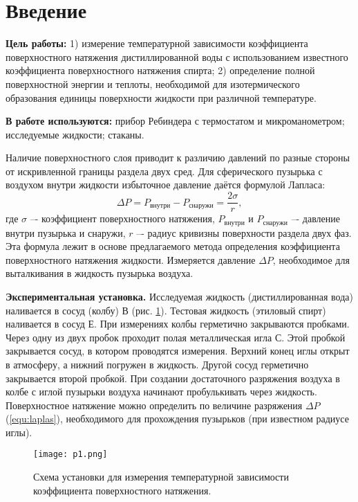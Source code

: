 \section{Введение}

\textbf{Цель работы:}
1) измерение температурной зависимости  коэффициента поверхностного натяжения дистиллированной воды с использованием известного коэффициента поверхностного натяжения спирта;  2) определение полной поверхностной энергии  и теплоты, необходимой для изотермического образования единицы  поверхности жидкости  при различной температуре.

\textbf{В работе используются:}
прибор  Ребиндера  с термостатом и микроманометром; исследуемые жидкости; стаканы.

Наличие поверхностного слоя приводит к различию давлений по разные стороны от искривленной границы раздела двух сред.  Для сферического пузырька с воздухом  внутри жидкости избыточное давление даётся формулой Лапласа:
\begin{equation}
    \Delta P = P_\text{внутри} - P_\text{снаружи} = \frac{2\sigma}{r},
    \label{equ:laplas}
\end{equation}
где $\sigma$ –- коэффициент поверхностного натяжения, $P_\text{внутри}$ и $P_\text{снаружи}$ –- давление внутри пузырька и снаружи, $r$ –- радиус кривизны поверхности раздела двух фаз. Эта формула лежит в основе предлагаемого метода определения коэффициента поверхностного натяжения жидкости. Измеряется давление $\Delta P$, необходимое для выталкивания в жидкость пузырька воздуха.

\textbf{Экспериментальная установка.} Исследуемая жидкость (дистиллированная вода) наливается в сосуд (колбу) В (рис. \ref*{pic:p1}). Тестовая жидкость  (этиловый спирт) наливается  в сосуд Е.  При измерениях  колбы герметично закрываются  пробками.   Через одну из двух пробок  проходит полая металлическая игла С. Этой пробкой закрывается сосуд, в котором  проводятся измерения. Верхний конец иглы открыт в атмосферу, а нижний погружен в жидкость. Другой сосуд герметично закрывается второй пробкой. При создании достаточного  разряжения воздуха в колбе с иглой пузырьки воздуха начинают пробулькивать через жидкость. Поверхностное натяжение можно определить по величине разряжения $\Delta P$ (\ref*{equ:laplas}), необходимого для прохождения пузырьков (при известном радиусе иглы).

\begin{figure}[h]
    \centering
    \texttt{[image: p1.png]}
    \caption{Схема установки для измерения температурной зависимости коэффициента поверхностного натяжения.}
    \label{pic:p1}
\end{figure}

